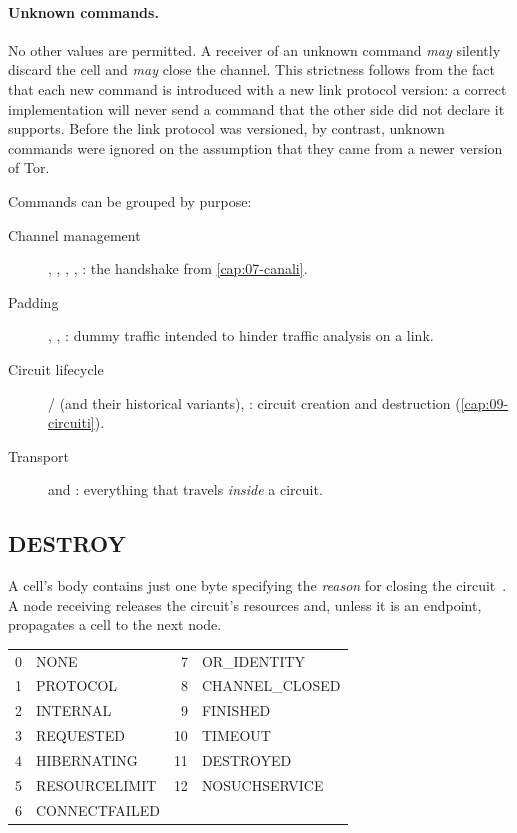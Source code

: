 \paragraph{Unknown commands.} No other values are permitted. A receiver of an unknown command \emph{may} silently discard the cell and \emph{may} close the channel. This strictness follows from the fact that each new command is introduced with a new link protocol version: a correct implementation will never send a command that the other side did not declare it supports. Before the link protocol was versioned, by contrast, unknown commands were ignored on the assumption that they came from a newer version of Tor.

Commands can be grouped by purpose:
\begin{description}
  \item[Channel management] , , , , : the handshake from \cref{cap:07-canali}.
  \item[Padding] , , : dummy traffic intended to hinder traffic analysis on a link.
  \item[Circuit lifecycle] / (and their historical variants), : circuit creation and destruction (\cref{cap:09-circuiti}).
  \item[Transport]  and : everything that travels \emph{inside} a circuit.
\end{description}

\subsection{DESTROY}

A  cell's body contains just one byte specifying the \emph{reason} for closing the circuit~. A node receiving  releases the circuit's resources and, unless it is an endpoint, propagates a  cell to the next node.

\begin{center}\small
\begin{tabular}{rl@{\qquad}rl}
\toprule
0 & NONE & 7 & OR\_IDENTITY \\
1 & PROTOCOL & 8 & CHANNEL\_CLOSED \\
2 & INTERNAL & 9 & FINISHED \\
3 & REQUESTED & 10 & TIMEOUT \\
4 & HIBERNATING & 11 & DESTROYED \\
5 & RESOURCELIMIT & 12 & NOSUCHSERVICE \\
6 & CONNECTFAILED & & \\
\bottomrule
\end{tabular}
\end{center}

